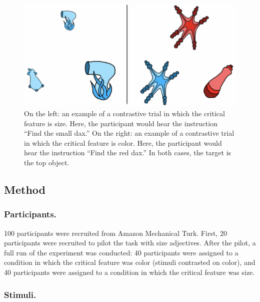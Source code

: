 \documentclass[10pt, letterpaper]{article}
\newenvironment{CodeChunk}{}{}
\begin{document}
\begin{CodeChunk}
\begin{figure}[H]

{\centering \includegraphics{figs/colortrial-1} 

}

\caption[On the left]{On the left: an example of a contrastive trial in which the critical feature is size. Here, the participant would hear the instruction ``Find the small dax.'' On the right: an example of a contrastive trial in which the critical feature is color. Here, the participant would hear the instruction ``Find the red dax.'' In both cases, the target is the top object.}\label{fig:colortrial}
\end{figure}
\end{CodeChunk}

\subsection{Method}\label{method}

\subsubsection{Participants.}\label{participants.}

100 participants were recruited from Amazon Mechanical Turk. First, 20
participants were recruited to pilot the task with size adjectives.
After the pilot, a full run of the experiment was conducted: 40
participants were assigned to a condition in which the critical feature
was color (stimuli contrasted on color), and 40 participants were
assigned to a condition in which the critical feature was size.

\subsubsection{Stimuli.}\label{stimuli.}
\end{document}
